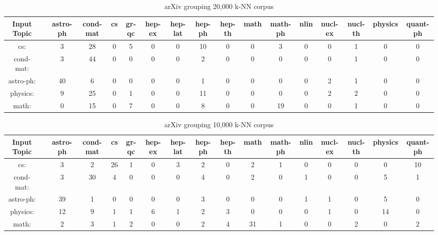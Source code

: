 \begin{sidewaystable}[h]
    \begin{tabular}{|c c c c c c c c c c c c c c c c c|}
         \hline
         Input Topic & & astro-ph & cond-mat & cs & gr-qc & hep-ex &hep-lat & hep-ph & hep-th & math & math-ph & nlin & nucl-ex & nucl-th & physics & quant-ph \\ [0.5ex]
         \hline\hline
         cs: & & 3 & 28 & 0 & 5 & 0 & 0 & 10 & 0 & 0 & 3 & 0 & 0 & 1 & 0 & 0 \\
         cond-mat: & & 3 & 44 & 0 & 0 & 0 & 0 & 2 & 0 & 0 & 0 & 0 & 0 & 1 & 0 & 0 \\
         astro-ph: & & 40 & 6 & 0 & 0 & 0 & 0 & 1 & 0 & 0 & 0 & 0 & 2 & 1 & 0 & 0 \\
         physics: & & 9 & 25 & 0 & 1 & 0 & 0 & 11 & 0 & 0 & 0 & 0 & 2 & 2 & 0 & 0\\
         math: & & 0 & 15 & 0 & 7 & 0 & 0 & 8 & 0 & 0 & 19 & 0 & 0 & 1 & 0 & 0 \\ [1ex]
         \hline
    \end{tabular}
    \caption{arXiv grouping 20,000 k-NN corpus}
    \label{table:arxiv20000knn}
\end{sidewaystable}

\begin{sidewaystable}[h]
    \begin{tabular}{|c c c c c c c c c c c c c c c c c|}
         \hline
         Input Topic & & astro-ph & cond-mat & cs & gr-qc & hep-ex &hep-lat & hep-ph & hep-th & math & math-ph & nlin & nucl-ex & nucl-th & physics & quant-ph \\ [0.5ex]
         \hline\hline
         cs: & & 3 & 2 & 26 & 1 & 0 & 3 & 2 & 0 & 2 & 1 & 0 & 0 & 0 & 0 & 10 \\
         cond-mat: & & 3 & 30 & 4 & 0 & 0 & 0 & 4 & 0 & 2 & 0 & 1 & 0 & 0 & 5 & 1 \\
         astro-ph: & & 39 & 1 & 0 & 0 & 0 & 0 & 3 & 0 & 0 & 0 & 1 & 1 & 0 & 5 & 0 \\
         physics: & & 12 & 9 & 1 & 1 & 6 & 1 & 2 & 3 & 0 & 0 & 0 & 1 & 0 & 14 & 0 \\
         math: & & 2 & 3 & 1 & 2 & 0 & 0 & 2 & 4 & 31 & 1 & 0 & 0 & 2 & 0 & 2 \\ [1ex]
         \hline
    \end{tabular}
    \caption{arXiv grouping 10,000 k-NN corpus}
    \label{table:arxiv10000knn}
\end{sidewaystable}

